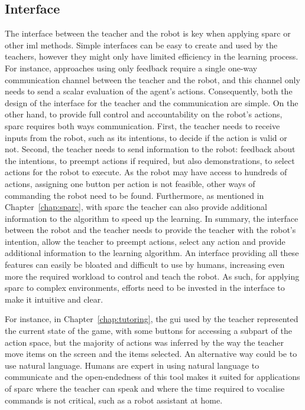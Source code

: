 \subsection{Interface}\label{sec:disc_lim_interface}
The interface between the teacher and the robot is key when applying \gls{sparc} or other \gls{iml} methods. Simple interfaces can be easy to create and used by the teachers, however they might only have limited efficiency in the learning process. For instance, approaches using only feedback require a single one-way communication channel between the teacher and the robot, and this channel only needs to send a scalar evaluation of the agent's actions. Consequently, both the design of the interface for the teacher and the communication are simple. On the other hand, to provide full control and accountability on the robot's actions, \gls{sparc} requires both ways communication. First, the teacher needs to receive inputs from the robot, such as its intentions, to decide if the action is valid or not. Second, the teacher needs to send information to the robot: feedback about the intentions, to preempt actions if required, but also demonstrations, to select actions for the robot to execute. As the robot may have access to hundreds of actions, assigning one button per action is not feasible, other ways of commanding the robot need to be found. Furthermore, as mentioned in Chapter~\ref{chap:sparc}, with \gls{sparc} the teacher can also provide additional information to the algorithm to speed up the learning. In summary, the interface between the robot and the teacher needs to provide the teacher with the robot's intention, allow the teacher to preempt actions, select any action and provide additional information to the learning algorithm. An interface providing all these features can easily be bloated and difficult to use by humans, increasing even more the required workload to control and teach the robot. As such, for applying \gls{sparc} to complex environments, efforts need to be invested in the interface to make it intuitive and clear. 

For instance, in Chapter~\ref{chap:tutoring}, the \gls{gui} used by the teacher represented the current state of the game, with some buttons for accessing a subpart of the action space, but the majority of actions was inferred by the way the teacher move items on the screen and the items selected. An alternative way could be to use natural language. Humans are expert in using natural language to communicate and the open-endedness of this tool makes it suited for applications of \gls{sparc} where the teacher can speak and where the time required to vocalise commands is not critical, such as a robot assistant at home.

